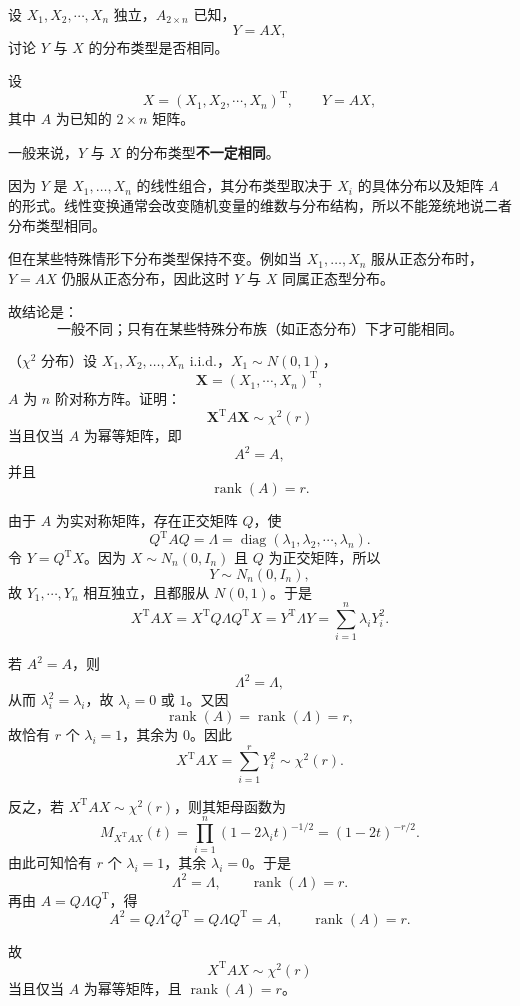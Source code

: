 \begin{homework}
设 \(X_1,X_2,\cdots,X_n\) 独立，\(A_{2\times n}\) 已知，
\[
Y=AX,
\]
讨论 \(Y\) 与 \(X\) 的分布类型是否相同。
\end{homework}
\begin{solution}
设
\[
X=(X_1,X_2,\cdots,X_n)^{\mathrm T},\qquad Y=AX,
\]
其中 \(A\) 为已知的 \(2\times n\) 矩阵。

一般来说，\(Y\) 与 \(X\) 的分布类型\textbf{不一定相同}。

因为 \(Y\) 是 \(X_1,\dots,X_n\) 的线性组合，其分布类型取决于 \(X_i\) 的具体分布以及矩阵 \(A\) 的形式。线性变换通常会改变随机变量的维数与分布结构，所以不能笼统地说二者分布类型相同。

但在某些特殊情形下分布类型保持不变。例如当 \(X_1,\dots,X_n\) 服从正态分布时，\(Y=AX\) 仍服从正态分布，因此这时 \(Y\) 与 \(X\) 同属正态型分布。

故结论是：
\[
\boxed{\text{一般不同；只有在某些特殊分布族（如正态分布）下才可能相同。}}
\]
\end{solution}
\begin{homework}[5]
（\(\chi^2\) 分布）设 \(X_1,X_2,\ldots,X_n\) i.i.d.，\(X_1\sim N(0,1)\)，
\[
\mathbf{X}=(X_1,\cdots,X_n)^{\mathrm T},
\]
\(A\) 为 \(n\) 阶对称方阵。证明：
\[
\mathbf{X}^{\mathrm T}A\mathbf{X}\sim \chi^2(r)
\]
当且仅当 \(A\) 为幂等矩阵，即
\[
A^2=A,
\]
并且
\[
\operatorname{rank}(A)=r.
\]
\end{homework}
\begin{solution}
由于 \(A\) 为实对称矩阵，存在正交矩阵 \(Q\)，使
\[
Q^{\mathrm T}AQ=\Lambda=\operatorname{diag}(\lambda_1,\lambda_2,\cdots,\lambda_n).
\]
令 \(Y=Q^{\mathrm T}X\)。因为 \(X\sim N_n(0,I_n)\) 且 \(Q\) 为正交矩阵，所以
\[
Y\sim N_n(0,I_n),
\]
故 \(Y_1,\cdots,Y_n\) 相互独立，且都服从 \(N(0,1)\)。于是
\[
X^{\mathrm T}AX
=
X^{\mathrm T}Q\Lambda Q^{\mathrm T}X
=
Y^{\mathrm T}\Lambda Y
=
\sum_{i=1}^n \lambda_i Y_i^2.
\]

若 \(A^2=A\)，则
\[
\Lambda^2=\Lambda,
\]
从而 \(\lambda_i^2=\lambda_i\)，故 \(\lambda_i=0\) 或 \(1\)。又因
\[
\operatorname{rank}(A)=\operatorname{rank}(\Lambda)=r,
\]
故恰有 \(r\) 个 \(\lambda_i=1\)，其余为 \(0\)。因此
\[
X^{\mathrm T}AX=\sum_{i=1}^r Y_i^2\sim \chi^2(r).
\]

反之，若 \(X^{\mathrm T}AX\sim\chi^2(r)\)，则其矩母函数为
\[
M_{X^{\mathrm T}AX}(t)=\prod_{i=1}^n (1-2\lambda_i t)^{-1/2}=(1-2t)^{-r/2}.
\]
由此可知恰有 \(r\) 个 \(\lambda_i=1\)，其余 \(\lambda_i=0\)。于是
\[
\Lambda^2=\Lambda,\qquad \operatorname{rank}(\Lambda)=r.
\]
再由 \(A=Q\Lambda Q^{\mathrm T}\)，得
\[
A^2=Q\Lambda^2Q^{\mathrm T}=Q\Lambda Q^{\mathrm T}=A,
\qquad
\operatorname{rank}(A)=r.
\]

故
\[
X^{\mathrm T}AX\sim\chi^2(r)
\]
当且仅当 \(A\) 为幂等矩阵，且 \(\operatorname{rank}(A)=r\)。
\end{solution}
